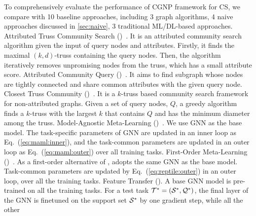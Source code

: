  To comprehensively evaluate the performance of
CGNP framework for CS, we compare with {10} baseline approaches,
including {3} graph algorithms, {4} naive approaches discussed in
\cref{sec:naive}, {3} traditional ML/DL-based approaches.
%
%
 Attributed Truss Community Search (\ATC)~\cite{ATC}. It is
an attributed community search algorithm given the input of query
nodes and attributes. Firstly, it finds the maximal $(k, d)$-truss
containing the query nodes. Then, the algorithm iteratively removes
unpromising nodes from the truss, which has a small attribute score.
%
%
 Attributed Community Query (\ACQ)~\cite{ACQ}. It aims to
find subgraph whose nodes are tightly connected and share common
attributes with the given query node.
%
%
 Closest Truss Community (\CTC)~\cite{CTC}. It is a
$k$-truss based community search framework for non-attributed
graphs. Given a set of query nodes, $Q$, a greedy algorithm finds a
$k$-truss with the largest $k$ that contains $Q$ and has the minimum
diameter among the truss.
%
%	
 Model-Agnostic Meta-Learning (\MAML)~\cite{MAML}. We use 
GNN as the base model. The task-specific parameters of  GNN are
updated in an inner loop as Eq.~(\ref{eq:maml:inner}), and the
task-common parameters are updated in an outer loop as
Eq.~(\ref{eq:maml:outer}) over all training tasks.
%
 First-Order Meta-Learning (\Reptile)~\cite{reptile}. As a
first-order alternative of \MAML, \Reptile adopts the same GNN as the
base model. Task-common parameters are updated by
Eq.~(\ref{eq:reptile:outer}) in an outer loop, over all the training
tasks.
%
 Feature Transfer (\Featrans). A base GNN model is
pre-trained on all the training tasks. For a test task $\mathcal{T}^*=
(\mathcal{S}^*, \mathcal{Q}^*)$, the final layer of the GNN is finetuned on
the support set $\mathcal{S}^*$ by one gradient step, while all the other
